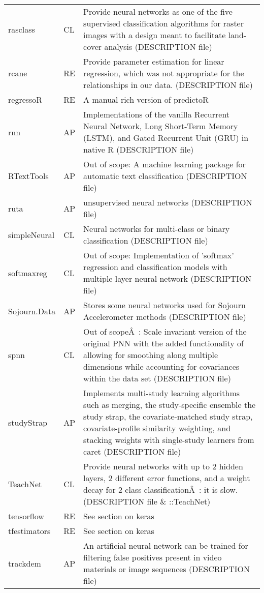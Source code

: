 \begin{Schunk}
\begin{longtable}[t]{ll>{\raggedright\arraybackslash}p{10cm}}
rasclass & CL & Provide neural networks as one of the five supervised classification algorithms for raster images with a design meant to facilitate land-cover analysis (DESCRIPTION file)\\
rcane & RE & Provide parameter estimation for linear regression, which was not appropriate for the relationships in our data. (DESCRIPTION file)\\
\addlinespace
regressoR & RE & A manual rich version of predictoR\\
rnn & AP & Implementations of the vanilla Recurrent Neural Network, Long Short-Term Memory (LSTM), and Gated Recurrent Unit (GRU) in native R (DESCRIPTION file)\\
RTextTools & AP & Out of scope: A machine learning package for automatic text classification (DESCRIPTION file)\\
ruta & AP & unsupervised neural networks (DESCRIPTION file)\\
simpleNeural & CL & Neural networks for multi-class or binary classification (DESCRIPTION file)\\
\addlinespace
softmaxreg & CL & Out of scope: Implementation of 'softmax' regression and classification models with multiple layer neural network (DESCRIPTION file)\\
Sojourn.Data & AP & Stores some neural networks used for Sojourn Accelerometer methods (DESCRIPTION file)\\
spnn & CL & Out of scopeÂ : Scale invariant version of the original PNN with the added functionality of allowing for smoothing along multiple dimensions while accounting for covariances within the data set (DESCRIPTION file)\\
studyStrap & AP & Implements multi-study learning algorithms such as merging, the study-specific ensemble the study strap, the covariate-matched study strap, covariate-profile similarity weighting, and stacking weights with single-study learners from caret (DESCRIPTION file)\\
TeachNet & CL & Provide neural networks with up to 2 hidden layers, 2 different error functions, and a weight decay for 2 class classificationÂ : it is slow. (DESCRIPTION file \& ::TeachNet)\\
\addlinespace
tensorflow & RE & See section on keras\\
tfestimators & RE & See section on keras\\
trackdem & AP & An artificial neural network can be trained for filtering false positives present in video materials or image sequences (DESCRIPTION file)\\

\end{longtable}
\end{Schunk}
